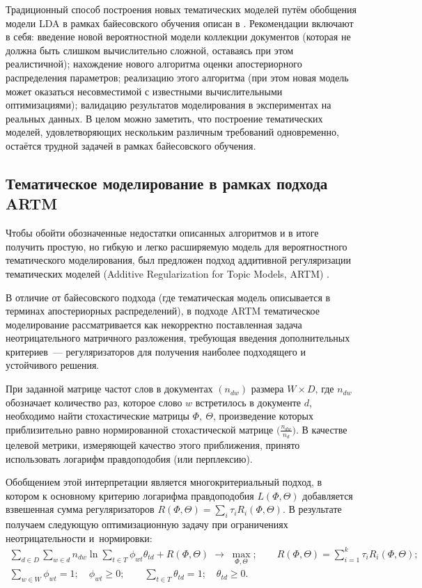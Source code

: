 Традиционный способ построения новых тематических моделей путём обобщения модели LDA в рамках байесовского обучения описан в  \cite{fntir2017applications}.
Рекомендации включают в себя:
введение новой вероятностной модели коллекции документов (которая не должна быть слишком вычислительно сложной, оставаясь при этом реалистичной);
нахождение нового алгоритма оценки апостериорного распределения параметров;
реализацию этого алгоритма (при этом новая модель может оказаться несовместимой с известными вычислительными оптимизациями);
валидацию результатов моделирования в экспериментах на реальных данных.
В целом можно заметить, что построение тематических моделей, удовлетворяющих нескольким различным требований одновременно, остаётся трудной задачей в рамках байесовского обучения.

\subsection{Тематическое моделирование в рамках подхода ARTM}

Чтобы обойти обозначенные недостатки описанных алгоритмов и в итоге получить простую, но гибкую и легко расширяемую модель для вероятностного тематического моделирования, был предложен подход аддитивной регуляризации тематических моделей (Additive Regularization for Topic Models, ARTM) \cite{vorontsov2014additive,vorontsov2014tutorial,voron15mlj}. 

В отличие от байесовского подхода (где тематическая модель описывается в терминах апостериорных распределений), в подходе ARTM тематическое моделирование рассматривается как некорректно поставленная задача неотрицательного матричного разложения, требующая введения дополнительных критериев~--- регуляризаторов для получения наиболее подходящего и устойчивого решения.

При заданной матрице частот слов в документах  $(n_{dw})$ размера $W{\times}D$, где $n_{dw}$ обозначает количество раз, которое слово  $w$ встретилось в документе $d$, необходимо найти стохастические матрицы $\Phi,~\Theta$, произведение которых приблизительно равно нормированной стохастической матрице $\bigl(\frac{n_{dw}}{n_d}\bigr)$. В качестве целевой метрики, измеряющей качество этого приближения, принято использовать логарифм правдоподобия (или перплексию).

Обобщением этой интерпретации является многокритериальный подход, в котором к основному критерию логарифма правдоподобия $L(\Phi, \Theta)$
добавляется взвешенная сумма регуляризаторов $R(\Phi, \Theta) = \sum_i \tau_i R_i(\Phi, \Theta)$. В результате получаем следующую оптимизационную задачу при ограничениях неотрицательности и~нормировки:
\begin{gather}
\label{eq:logL+R}
    \sum_{d\in D} \sum_{w\in d}
        n_{dw}\ln
        \sum_{t\in T}
            \phi_{wt}\theta_{td}
    + R(\Phi,\Theta)
    \;\to\; \max_{\Phi,\Theta};
    \qquad
    R(\Phi,\Theta)
    = \sum_{i=1}^k \tau_i R_i(\Phi,\Theta);
\\
\label{eq:logL.constraints}
    \sum_{w\in W} \phi_{wt} = 1;
    \quad
    \phi_{wt}\geq 0;
    \qquad
    \sum_{t\in T} \theta_{td} = 1;
    \quad
    \theta_{td}\geq 0.
\end{gather}

